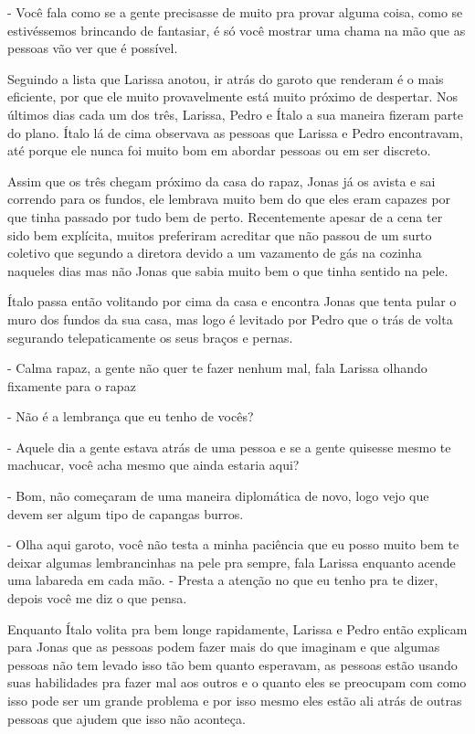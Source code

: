 - Você fala como se a gente precisasse de muito pra provar alguma coisa, como se estivéssemos brincando de fantasiar, é só você mostrar uma chama na mão que as pessoas vão ver que é possível.


Seguindo a lista que Larissa anotou, ir atrás do garoto que renderam é o mais eficiente, por que ele muito provavelmente está muito próximo de despertar. Nos últimos dias cada um dos três, Larissa, Pedro e Ítalo a sua maneira fizeram parte do plano. Ítalo lá de cima observava as pessoas que Larissa e Pedro encontravam, até porque ele nunca foi muito bom em abordar pessoas ou em ser discreto.

Assim que os três chegam próximo da casa do rapaz, Jonas já os avista e sai correndo para os fundos, ele lembrava muito bem do que eles eram capazes por que tinha passado por tudo bem de perto. Recentemente apesar de a cena ter sido bem explícita, muitos preferiram acreditar que não passou de um surto coletivo que segundo a diretora devido a um vazamento de gás na cozinha naqueles dias mas não Jonas que sabia muito bem o que tinha sentido na pele.

Ítalo passa então volitando por cima da casa e encontra Jonas que tenta pular o muro dos fundos da sua casa, mas logo é levitado por Pedro que o trás de volta segurando telepaticamente os seus braços e pernas.

- Calma rapaz, a gente não quer te fazer nenhum mal, fala Larissa olhando fixamente para o rapaz

- Não é a lembrança que eu tenho de vocês?

- Aquele dia a gente estava atrás de uma pessoa e se a gente quisesse mesmo te machucar, você acha mesmo que ainda estaria aqui?

- Bom, não começaram de uma maneira diplomática de novo, logo vejo que devem ser algum tipo de capangas burros.

- Olha aqui garoto, você não testa a minha paciência que eu posso muito bem te deixar algumas lembrancinhas na pele pra sempre, fala Larissa enquanto acende uma labareda em cada mão. - Presta a atenção no que eu tenho pra te dizer, depois você me diz o que pensa.


Enquanto Ítalo volita pra bem longe rapidamente, Larissa e Pedro então explicam para Jonas que as pessoas podem fazer mais do que imaginam e que algumas pessoas não tem levado isso tão bem quanto esperavam, as pessoas estão usando suas habilidades pra fazer mal aos outros e o quanto eles se preocupam com como isso pode ser um grande problema e por isso mesmo eles estão ali atrás de outras pessoas que ajudem que isso não aconteça.

